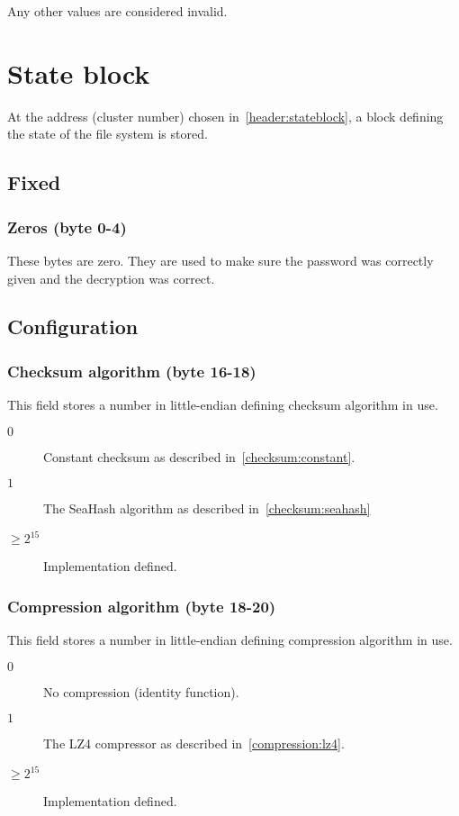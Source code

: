 \documentclass[11pt,a4paper]{report}
\begin{document}
        Any other values are considered invalid.

    \chapter{State block}
    \label{stateblock}
    At the address (cluster number) chosen in~\ref{header:stateblock}, a block
    defining the state of the file system is stored.

    \section{Fixed}
        \subsection{Zeros (byte 0-4)}
        These bytes are zero. They are used to make sure the password was
        correctly given and the decryption was correct.

    \section{Configuration}
        \subsection{Checksum algorithm (byte 16-18)}
        \label{config:checksum}
        This field stores a number in little-endian defining checksum algorithm
        in use.

        \begin{description}
            \item [$0$] Constant checksum as described
                in~\ref{checksum:constant}.
            \item [$1$] The SeaHash algorithm as described
                in~\ref{checksum:seahash}
            \item [$\geq 2^{15}$] Implementation defined.
        \end{description}

        \subsection{Compression algorithm (byte 18-20)}
        \label{config:compression}
        This field stores a number in little-endian defining compression
        algorithm in use.

        \begin{description}
            \item [$0$] No compression (identity function).
            \item [$1$] The LZ4 compressor as described
                in~\ref{compression:lz4}.
            \item [$\geq 2^{15}$] Implementation defined.
        \end{description}
\end{document}
